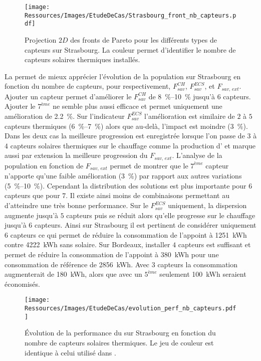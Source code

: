 \begin{figure}
    \centering
    \texttt{[image: Ressources/Images/EtudeDeCas/Strasbourg\_front\_nb\_capteurs.pdf]}
    \caption[Fronts de Pareto pour les différents types de capteurs sur Strasbourg]
             {Projection $2D$ des fronts de Pareto pour les différents types de capteurs sur Strasbourg.
             La couleur permet d’identifier le nombre de capteurs solaires thermiques installés.}
    \label{fig:front_pareto_nb_th}
\end{figure}


La  permet de mieux apprécier l’évolution de la
population sur Strasbourg en fonction du nombre de capteurs, pour respectivement, $F_{sav}^{CH}$,
$F_{sav}^{ECS}$, et $F_{sav,\, ext}$. Ajouter un capteur permet d’améliorer le
$F_{sav}^{CH}$ de \SIrange{8}{10}{\percent} jusqu’à $6$ capteurs. Ajouter le $7^{ème}$ ne
semble plus aussi efficace et permet uniquement une amélioration de \SI{2.2}{\percent}. Sur
l’indicateur $F_{sav}^{ECS}$ l’amélioration est similaire de $2$ à $5$ capteurs thermiques
(\SIrange{6}{7}{\percent}) alors que au-delà, l’impact est moindre (\SI{3}{\percent}).
Dans les deux cas la meilleure progression est enregistrée lorsque l’on passe de $3$ à $4$
capteurs solaires thermiques sur le chauffage comme la production d’ et marque
aussi par extension la meilleure progression du $F_{sav,\, ext}$. L’analyse de la
population en fonction de $F_{sav,\, ext}$ permet de montrer que le $7^{ème}$ capteur
n’apporte qu’une faible amélioration (\SI{3}{\percent}) par rapport aux autres variations
(\SIrange{5}{10}{\percent}). Cependant la distribution des solutions est plus importante
pour $6$ capteurs que pour $7$. Il existe ainsi moins de combinaisons permettant au
 d’atteindre une très bonne performance. Sur le $F_{sav}^{ECS}$ uniquement, la
dispersion augmente jusqu’à $5$ capteurs puis se réduit alors qu’elle progresse sur le
chauffage jusqu’à $6$ capteurs. Ainsi sur Strasbourg il est pertinent de considérer
uniquement $6$ capteurs ce qui permet de réduire la consommation de l’appoint à
\SI{1251}{kWh} contre \SI{4222}{kWh} sans solaire. Sur Bordeaux, installer $4$ capteurs
est suffisant et permet de réduire la consommation de l’appoint à \SI{380}{kWh} pour une
consommation de référence de \SI{2856}{kWh}. Avec $3$ capteurs la consommation
augmenterait de \SI{180}{kWh}, alors que avec un $5^{ème}$ seulement \SI{100}{kWh} seraient
économisés.

\begin{figure}
    \centering
    \texttt{[image: Ressources/Images/EtudeDeCas/evolution\_perf\_nb\_capteurs.pdf]}
    \caption[Performance du  sur Strasbourg en fonction du nombre de capteurs solaires thermiques]
             {Évolution de la performance du  sur Strasbourg en fonction du nombre de capteurs solaires thermiques.
              Le jeu de couleur est identique à celui utilisé dans .}
    \label{fig:perf_nb_th}
\end{figure}


